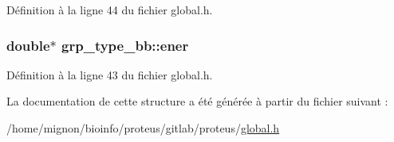 Définition à la ligne 44 du fichier global.\+h.

\hypertarget{structgrp__type__bb_a70906fe692863912bbdcd3b06de49bfd}{
\subsubsection[{ener}]{\setlength{\rightskip}{0pt plus 5cm}double$\ast$ grp\+\_\+type\+\_\+bb\+::ener}}\label{structgrp__type__bb_a70906fe692863912bbdcd3b06de49bfd}


Définition à la ligne 43 du fichier global.\+h.



La documentation de cette structure a été générée à partir du fichier suivant \+:\begin{DoxyCompactItemize}
\item 
/home/mignon/bioinfo/proteus/gitlab/proteus/\hyperlink{global_8h}{global.\+h}\end{DoxyCompactItemize}
